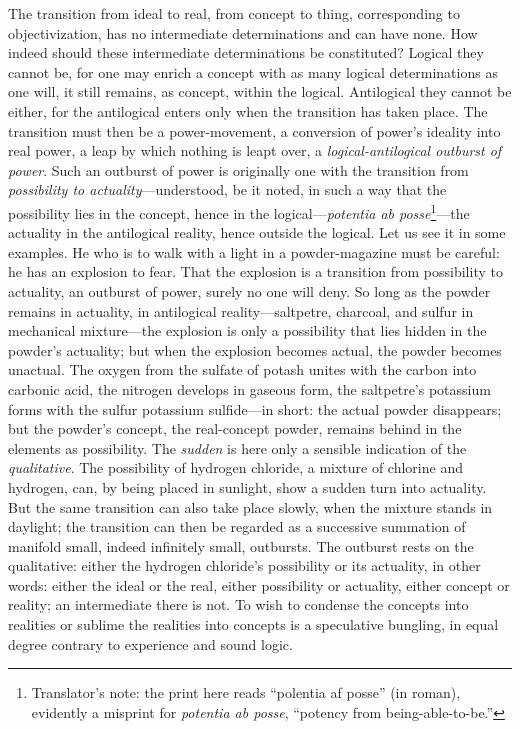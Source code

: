 \documentclass[12pt]{article}
\begin{document}
The transition from ideal to real, from concept to thing, corresponding to
objectivization, has no intermediate determinations and can have none. How
indeed should these intermediate determinations be constituted? Logical they
cannot be, for one may enrich a concept with as many logical determinations
as one will, it still remains, as concept, within the logical. Antilogical
they cannot be either, for the antilogical enters only when the transition
has taken place. The transition must then be a power-movement, a conversion
of power's ideality into real power, a leap by which nothing is leapt over, a
\emph{logical-antilogical outburst of power}. Such an outburst of power is
originally one with the transition from \emph{possibility to
actuality}—understood, be it noted, in such a way that the possibility lies
in the concept, hence in the logical---\textit{potentia ab
posse}\footnote{Translator's note: the print here reads ``polentia af
posse'' (in roman), evidently a misprint for \textit{potentia ab posse},
``potency from being-able-to-be.''}---the actuality in the antilogical
reality, hence outside the logical. Let us see it in some examples. He who is
to walk with a light in a powder-magazine must be careful: he has an
explosion to fear. That the explosion is a transition from possibility to
actuality, an outburst of power, surely no one will deny. So long as the
powder remains in actuality, in antilogical reality—saltpetre, charcoal, and
sulfur in mechanical mixture—the explosion is only a possibility that lies
hidden in the powder's actuality; but when the explosion becomes actual, the
powder becomes unactual. The oxygen from the sulfate of potash unites with
the carbon into carbonic acid, the nitrogen develops in gaseous form, the
saltpetre's potassium forms with the sulfur potassium sulfide—in short: the
actual powder disappears; but the powder's concept, the real-concept powder,
remains behind in
the elements as possibility. The \emph{sudden} is here only a sensible
indication of the \emph{qualitative}. The possibility of hydrogen chloride,
a mixture of chlorine and hydrogen, can, by being placed in sunlight, show a
sudden turn into actuality. But the same transition can also take place
slowly, when the mixture stands in daylight; the transition can then be
regarded as a successive summation of manifold small, indeed infinitely
small, outbursts. The outburst rests on the qualitative: either the hydrogen
chloride's possibility or its actuality, in other words: either the ideal or
the real, either possibility or actuality, either concept or reality; an
intermediate there is not. To wish to condense the concepts into realities
or sublime the realities into concepts is a speculative bungling, in equal
degree contrary to experience and sound logic.
\end{document}
